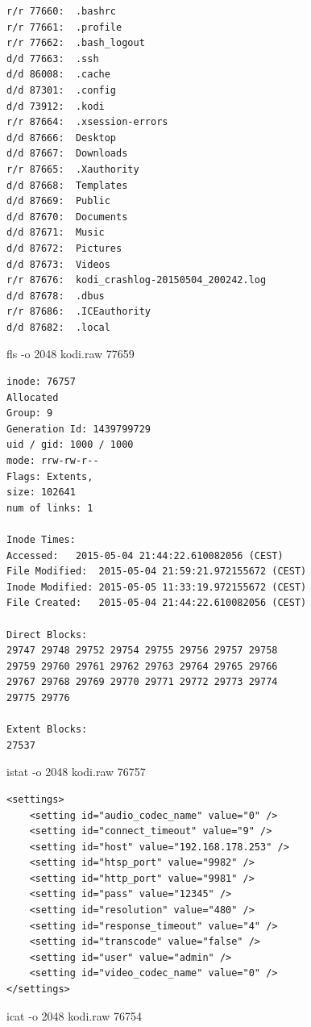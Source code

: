 \begin{cmd}[H]
\begin{verbatim}
r/r 77660:	.bashrc
r/r 77661:	.profile
r/r 77662:	.bash_logout
d/d 77663:	.ssh
d/d 86008:	.cache
d/d 87301:	.config
d/d 73912:	.kodi
r/r 87664:	.xsession-errors
d/d 87666:	Desktop
d/d 87667:	Downloads
r/r 87665:	.Xauthority
d/d 87668:	Templates
d/d 87669:	Public
d/d 87670:	Documents
d/d 87671:	Music
d/d 87672:	Pictures
d/d 87673:	Videos
r/r 87676:	kodi_crashlog-20150504_200242.log
d/d 87678:	.dbus
r/r 87686:	.ICEauthority
d/d 87682:	.local
\end{verbatim}
\caption{fls -o 2048 kodi.raw 77659}
\label{cmd:kodi-homedir}
\end{cmd}

\begin{cmd}[H]
\begin{verbatim}
inode: 76757
Allocated
Group: 9
Generation Id: 1439799729
uid / gid: 1000 / 1000
mode: rrw-rw-r--
Flags: Extents,
size: 102641
num of links: 1

Inode Times:
Accessed:	2015-05-04 21:44:22.610082056 (CEST)
File Modified:	2015-05-04 21:59:21.972155672 (CEST)
Inode Modified:	2015-05-05 11:33:19.972155672 (CEST)
File Created:	2015-05-04 21:44:22.610082056 (CEST)

Direct Blocks:
29747 29748 29752 29754 29755 29756 29757 29758
29759 29760 29761 29762 29763 29764 29765 29766
29767 29768 29769 29770 29771 29772 29773 29774
29775 29776

Extent Blocks:
27537
\end{verbatim}
\caption{istat -o 2048 kodi.raw 76757}
\label{cmd:kodi-logfileaccess}
\end{cmd}

\begin{cmd}[H]
\begin{verbatim}
<settings>
    <setting id="audio_codec_name" value="0" />
    <setting id="connect_timeout" value="9" />
    <setting id="host" value="192.168.178.253" />
    <setting id="htsp_port" value="9982" />
    <setting id="http_port" value="9981" />
    <setting id="pass" value="12345" />
    <setting id="resolution" value="480" />
    <setting id="response_timeout" value="4" />
    <setting id="transcode" value="false" />
    <setting id="user" value="admin" />
    <setting id="video_codec_name" value="0" />
</settings>
\end{verbatim}
\caption{icat -o 2048 kodi.raw 76754}
\label{cmd:kodi-tvheadend}
\end{cmd}

